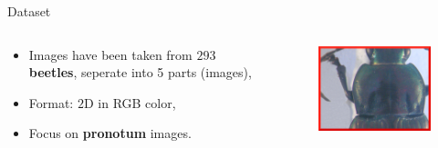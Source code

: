 \documentclass[10pt]{beamer}
\begin{document}


\begin{frame}[c]{Dataset}
	\begin{columns}
		\begin{column}{0.5\textwidth}
			\begin{itemize}
    			\item Images have been taken from $293$ \textbf{beetles}, seperate into 5 parts (images),
    			\item Format: $2$D in RGB color,
    			\item Focus on \textbf{\color{red}pronotum} images.
  			\end{itemize}
		\end{column}
		\begin{column}{0.5\textwidth}  %
    		\begin{center}
     			\begin{figure}[htbp]
        			\centering
        			\includegraphics[scale=1]{images/pronotum}
    				\label{figrsexample1}
				\end{figure}
     		\end{center}
		\end{column}
	\end{columns}~\\
	\begin{figure}[htbp]
   				\begin{subfigure}[t]{0.22\textwidth}
        			\centering

\end{subfigure}
\end{figure}
\end{frame}
\end{document}
